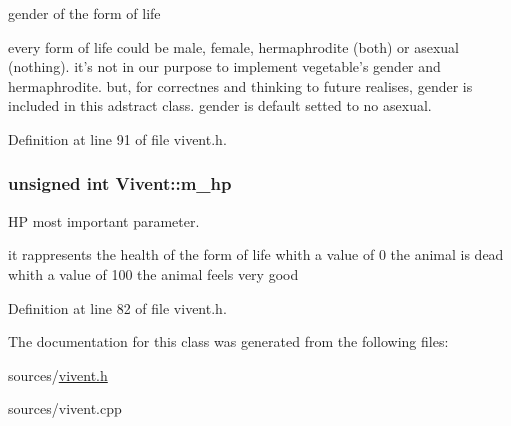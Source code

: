 gender of the form of life 

every form of life could be male, female, hermaphrodite (both) or asexual (nothing). it's not in our purpose to implement vegetable's gender and hermaphrodite. but, for correctnes and thinking to future realises, gender is included in this adstract class. gender is default setted to no asexual. 

Definition at line 91 of file vivent.h.

\hypertarget{classVivent_a6721d9dd0929a7bc729c67ab8528e8d9}{
\subsubsection[{m\_\-hp}]{\setlength{\rightskip}{0pt plus 5cm}unsigned int {\bf Vivent::m\_\-hp}}}
\label{classVivent_a6721d9dd0929a7bc729c67ab8528e8d9}


HP most important parameter. 

it rappresents the health of the form of life whith a value of 0 the animal is dead whith a value of 100 the animal feels very good 

Definition at line 82 of file vivent.h.



The documentation for this class was generated from the following files:\begin{DoxyCompactItemize}
\item 
sources/\hyperlink{vivent_8h}{vivent.h}\item 
sources/vivent.cpp\end{DoxyCompactItemize}
